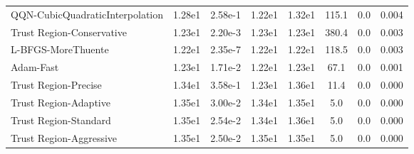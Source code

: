 \documentclass{article}
\begin{document}
\begin{table}[htbp]
{\begin{tabular}{p{2.5cm}*{7}{c}}
QQN-CubicQuadraticInterpolation & 1.28e1 & 2.58e-1 & 1.22e1 & 1.32e1 & 115.1 & 0.0 & 0.004 \\
Trust Region-Conservative & 1.23e1 & 2.20e-3 & 1.23e1 & 1.23e1 & 380.4 & 0.0 & 0.003 \\
L-BFGS-MoreThuente & 1.22e1 & 2.35e-7 & 1.22e1 & 1.22e1 & 118.5 & 0.0 & 0.003 \\
Adam-Fast & 1.23e1 & 1.71e-2 & 1.22e1 & 1.23e1 & 67.1 & 0.0 & 0.001 \\
Trust Region-Precise & 1.34e1 & 3.58e-1 & 1.23e1 & 1.36e1 & 11.4 & 0.0 & 0.000 \\
Trust Region-Adaptive & 1.35e1 & 3.00e-2 & 1.34e1 & 1.35e1 & 5.0 & 0.0 & 0.000 \\
Trust Region-Standard & 1.35e1 & 2.54e-2 & 1.34e1 & 1.36e1 & 5.0 & 0.0 & 0.000 \\
Trust Region-Aggressive & 1.35e1 & 2.50e-2 & 1.35e1 & 1.35e1 & 5.0 & 0.0 & 0.000 \\
\bottomrule
\end{tabular}
}
\end{table}
\end{document}
